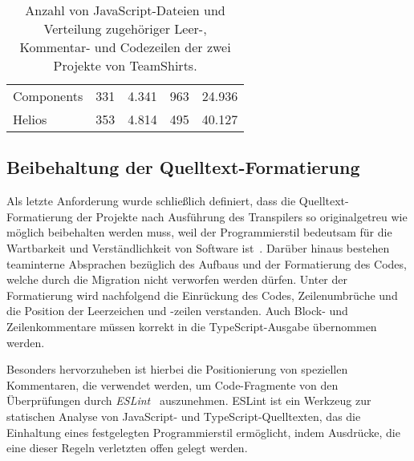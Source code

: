 \bigbreak
\begin{table}[tbh]
  \footnotesize
  \begin{tabu} to 
    \midrule
     &  &  &  &   \\
    \midrule
    Components & 331 & 4.341 & 963 & 24.936 \\
    Helios & 353 & 4.814 & 495 & 40.127 \\
    \midrule
  \end{tabu}
  \caption{Anzahl von JavaScript-Dateien und Verteilung zugehöriger Leer-, Kommentar- und Codezeilen der zwei Projekte von TeamShirts.}
  \label{tab:projects-loc}
\end{table}

\subsection{Beibehaltung der Quelltext-Formatierung}
\label{sec:requirement:format}

Als letzte Anforderung wurde schließlich definiert, dass die Quelltext-Formatierung der Projekte nach Ausführung des Transpilers so originalgetreu wie möglich beibehalten werden muss, weil der Programmierstil bedeutsam für die Wartbarkeit und Verständlichkeit von Software ist~\autocite[146]{KERNIGHAN:1982}. Darüber hinaus bestehen teaminterne Absprachen bezüglich des Aufbaus und der Formatierung des Codes, welche durch die Migration nicht verworfen werden dürfen. Unter der Formatierung wird nachfolgend die Einrückung des Codes, Zeilenumbrüche und die Position der Leerzeichen und -zeilen verstanden. Auch Block- und Zeilenkommentare müssen korrekt in die TypeScript-Ausgabe übernommen werden.

Besonders hervorzuheben ist hierbei die Positionierung von speziellen Kommentaren, die verwendet werden, um Code-Fragmente von den Überprüfungen durch \textit{ESLint}~\autocite{ESLINT} auszunehmen. ESLint ist ein Werkzeug zur statischen Analyse von JavaScript- und TypeScript-Quelltexten, das die Einhaltung eines festgelegten Programmierstil ermöglicht, indem Ausdrücke, die eine dieser Regeln verletzten offen gelegt werden.
